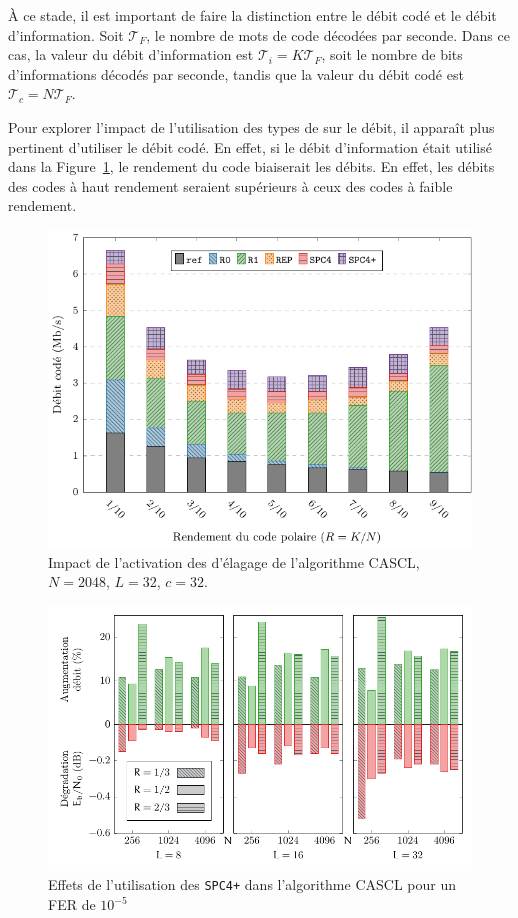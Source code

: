 \`A ce stade, il est important de faire la distinction entre le débit codé et le débit d'information. Soit $\mathcal{T}_F$, le nombre de mots de code décodées par seconde. Dans ce cas, la valeur du débit d'information est $\mathcal{T}_i=K\mathcal{T}_F$, soit le nombre de bits d'informations décodés par seconde, tandis que la valeur du débit codé est $\mathcal{T}_c=N\mathcal{T}_F$.

Pour explorer l'impact de l'utilisation des types de \noeuds sur le débit, il apparaît plus pertinent d'utiliser le débit codé. En effet, si le débit d'information était utilisé dans la Figure~\ref{fig:nodes}, le rendement du code \og biaiserait \fg les débits. En effet, les débits des codes à haut rendement seraient supérieurs à ceux des codes à faible rendement.
\begin{figure}[t]
\includegraphics[width=\textwidth]{main/ch2_fig/curves/tree/tikz/tree}
\caption{Impact de l'activation des \noeuds d'élagage de l'algorithme CASCL, $N=2048$, $L=32$, $c=32$.}
\label{fig:nodes}
\end{figure}

\begin{figure}[t]
\includegraphics[width=\textwidth]{main/ch2_fig/curves/thr_spc/tikz/thr_spc_diff}
\caption{Effets de l'utilisation des \noeuds \texttt{SPC4+} dans l'algorithme CASCL pour un FER de $10^{-5}$}
\label{fig:spc_impact}
\end{figure}

